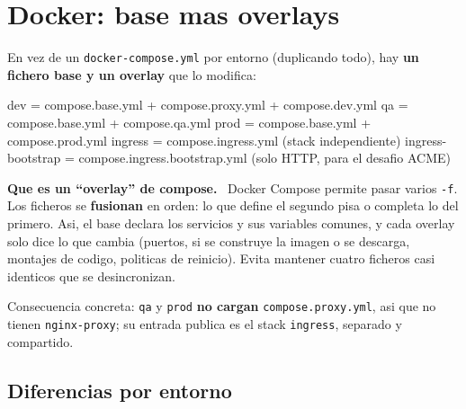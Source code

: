 \documentclass[11pt,a4paper,oneside]{report}
\newenvironment{concepto}[1][Concepto para juniors]{%
  \par\medskip
  \colorlet{shadecolor}{blue!7}%
  \begin{shaded}\noindent\textbf{\color{blue!55!black}#1.}\ \ignorespaces}%
  {\end{shaded}\par\medskip}
\newcommand{\rt}[1]{\texttt{#1}}
\begin{document}
\section{Docker: base mas overlays}

En vez de un \rt{docker-compose.yml} por entorno (duplicando todo), hay \textbf{un fichero base
y un overlay} que lo modifica:

\begin{diagrama}
dev     = compose.base.yml + compose.proxy.yml + compose.dev.yml
qa      = compose.base.yml + compose.qa.yml
prod    = compose.base.yml + compose.prod.yml
ingress = compose.ingress.yml              (stack independiente)
ingress-bootstrap = compose.ingress.bootstrap.yml   (solo HTTP, para el desafio ACME)
\end{diagrama}

\begin{concepto}[Que es un ``overlay'' de compose]
Docker Compose permite pasar varios \rt{-f}. Los ficheros se \textbf{fusionan} en orden: lo que
define el segundo pisa o completa lo del primero. Asi, el base declara los servicios y sus
variables comunes, y cada overlay solo dice lo que cambia (puertos, si se construye la imagen o
se descarga, montajes de codigo, politicas de reinicio). Evita mantener cuatro ficheros casi
identicos que se desincronizan.
\end{concepto}

Consecuencia concreta: \rt{qa} y \rt{prod} \textbf{no cargan} \rt{compose.proxy.yml}, asi que
no tienen \rt{nginx-proxy}; su entrada publica es el stack \rt{ingress}, separado y compartido.

\subsection{Diferencias por entorno}
\end{document}
